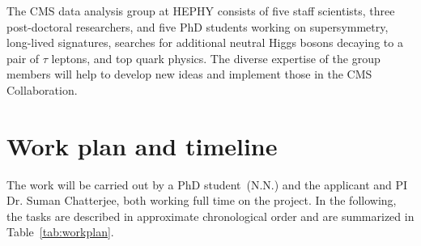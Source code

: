 \documentclass[a4paper,11pt]{article}
\begin{document}
The CMS data analysis group at HEPHY consists of five staff scientists,  three post-doctoral researchers,  and five PhD students working on supersymmetry, long-lived signatures, searches for additional neutral Higgs bosons decaying to a pair of $\tau$ leptons, and top quark physics. 
The diverse expertise of the group members will help to develop new ideas and implement those in the CMS Collaboration.

\section{Work plan and timeline}

The work will be carried out by a PhD student~(N.N.) and the applicant and PI Dr. Suman Chatterjee, both working full time on the project. 
In the following, the tasks are described in approximate chronological order and are summarized in Table~\ref{tab:workplan}.%
\end{document}
